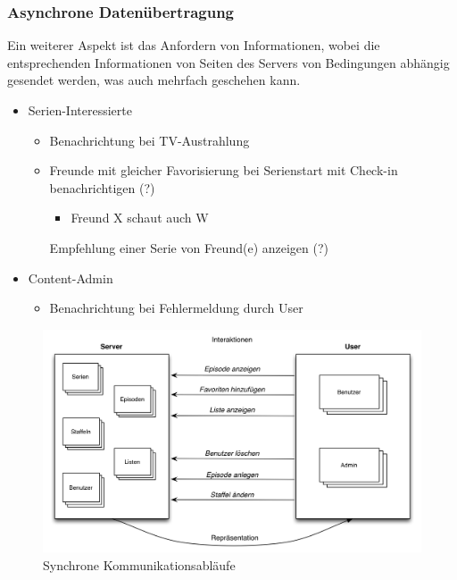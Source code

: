 \documentclass[a4paper]{article}
\begin{document}
\subsubsection{Asynchrone Datenübertragung}

Ein weiterer Aspekt ist das Anfordern von Informationen, wobei die entsprechenden Informationen von Seiten des Servers von Bedingungen abhängig gesendet werden, was auch mehrfach geschehen kann.

\begin{itemize}
\item
Serien-Interessierte
	\begin{itemize}
	\item
    Benachrichtung bei TV-Austrahlung
    \item
    Freunde mit gleicher Favorisierung bei Serienstart mit Check-in benachrichtigen (?)
	    \begin{itemize}
	    \item
         Freund X schaut auch W
         \end{itemize}
    Empfehlung einer Serie von Freund(e) anzeigen (?)
    \end{itemize}
\item
Content-Admin
	\begin{itemize}
	\item
    Benachrichtung bei Fehlermeldung durch User
    \end{itemize}
\end{itemize}



\begin{figure}[H]
\includegraphics[width=1\textwidth]{images/kommunikationsablaeufe.png}
\caption{Synchrone Kommunikationsabläufe}
\label{kommunikationsablaeufe}
\end{figure}
\end{document}
